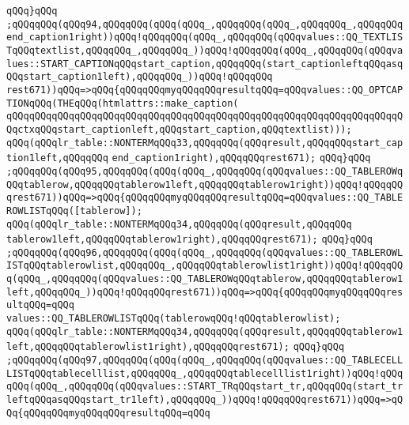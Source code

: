 \verb|qQQq}qQQq|\newline
\verb|;qQQqqQQq(qQQq94,qQQqqQQq(qQQq(qQQq_,qQQqqQQq(qQQq_,qQQqqQQq_,qQQqqQQqend_caption1right))qQQq!qQQqqQQq(qQQq_,qQQqqQQq(qQQqvalues::QQ_TEXTLISTqQQqtextlist,qQQqqQQq_,qQQqqQQq_))qQQq!qQQqqQQq(qQQq_,qQQqqQQq(qQQqvalues::START_CAPTIONqQQqstart_caption,qQQqqQQq(start_captionleftqQQqasqQQqstart_caption1left),qQQqqQQq_))qQQq!qQQqqQQq|\newline
\verb|rest671))qQQq=>qQQq{qQQqqQQqmyqQQqqQQqresultqQQq=qQQqvalues::QQ_OPTCAPTIONqQQq(THEqQQq(htmlattrs::make_caption(|\newline
\verb|qQQqqQQqqQQqqQQqqQQqqQQqqQQqqQQqqQQqqQQqqQQqqQQqqQQqqQQqqQQqqQQqqQQqqQQqctxqQQqstart_captionleft,qQQqstart_caption,qQQqtextlist)));|\newline
\verb|qQQq(qQQqlr_table::NONTERMqQQq33,qQQqqQQq(qQQqresult,qQQqqQQqstart_caption1left,qQQqqQQq|\newline
\verb|end_caption1right),qQQqqQQqrest671);|\newline
\verb|qQQq}qQQq|\newline
\verb|;qQQqqQQq(qQQq95,qQQqqQQq(qQQq(qQQq_,qQQqqQQq(qQQqvalues::QQ_TABLEROWqQQqtablerow,qQQqqQQqtablerow1left,qQQqqQQqtablerow1right))qQQq!qQQqqQQqrest671))qQQq=>qQQq{qQQqqQQqmyqQQqqQQqresultqQQq=qQQqvalues::QQ_TABLEROWLISTqQQq([tablerow]);|\newline
\verb|qQQq(qQQqlr_table::NONTERMqQQq34,qQQqqQQq(qQQqresult,qQQqqQQq|\newline
\verb|tablerow1left,qQQqqQQqtablerow1right),qQQqqQQqrest671);|\newline
\verb|qQQq}qQQq|\newline
\verb|;qQQqqQQq(qQQq96,qQQqqQQq(qQQq(qQQq_,qQQqqQQq(qQQqvalues::QQ_TABLEROWLISTqQQqtablerowlist,qQQqqQQq_,qQQqqQQqtablerowlist1right))qQQq!qQQqqQQq(qQQq_,qQQqqQQq(qQQqvalues::QQ_TABLEROWqQQqtablerow,qQQqqQQqtablerow1left,qQQqqQQq_))qQQq!qQQqqQQqrest671))qQQq=>qQQq{qQQqqQQqmyqQQqqQQqresultqQQq=qQQq|\newline
\verb|values::QQ_TABLEROWLISTqQQq(tablerowqQQq!qQQqtablerowlist);|\newline
\verb|qQQq(qQQqlr_table::NONTERMqQQq34,qQQqqQQq(qQQqresult,qQQqqQQqtablerow1left,qQQqqQQqtablerowlist1right),qQQqqQQqrest671);|\newline
\verb|qQQq}qQQq|\newline
\verb|;qQQqqQQq(qQQq97,qQQqqQQq(qQQq(qQQq_,qQQqqQQq(qQQqvalues::QQ_TABLECELLLISTqQQqtablecelllist,qQQqqQQq_,qQQqqQQqtablecelllist1right))qQQq!qQQqqQQq(qQQq_,qQQqqQQq(qQQqvalues::START_TRqQQqstart_tr,qQQqqQQq(start_trleftqQQqasqQQqstart_tr1left),qQQqqQQq_))qQQq!qQQqqQQqrest671))qQQq=>qQQq{qQQqqQQqmyqQQqqQQqresultqQQq=qQQq|\newline

